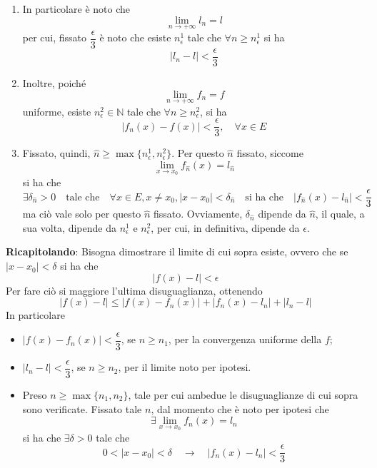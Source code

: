 \documentclass[a4paper]{extarticle}
\begin{document}
\begin{enumerate}
    \item In particolare è noto che
    \[\lim_{n \to +\infty} l_n = l\]
    per cui, fissato $\dfrac{\epsilon}{3}$ è noto che esiste $n^1_\epsilon$ tale che $\forall n \geq n^1_\epsilon$ si ha
    \[\left \vert l_n - l \right \vert < \frac{\epsilon}{3}\]

    \item Inoltre, poiché
    \[\lim_{n \to +\infty} f_n = f\]
    uniforme, esiste $n^2_\epsilon \in \mathbb{N}$ tale che $\forall n \geq n^2_\epsilon$, si ha
    \[\left \vert f_n(x) - f(x) \right \vert < \frac{\epsilon}{3}, \hspace{1em} \forall x \in E\]

    \item Fissato, quindi, $\hat n \geq \max \{n^1_\epsilon,n^2_\epsilon\}$. Per questo $\hat n$ fissato, siccome
    \[\lim_{x \to x_0} f_{\hat n}(x) = l_{\hat n}\]
    si ha che
    \[\exists \delta_{\hat n} > 0 \hspace{1em} \text{tale che} \hspace{1em}\forall x \in E, x \neq x_0, \left \vert x - x_0 \right \vert < \delta_{\hat n} \hspace{1em} \text{si ha che} \hspace{1em} \left \vert f_{\hat n}(x) - l_{\hat n} \right \vert < \frac{\epsilon}{3}\]
    ma ciò vale solo per questo $\hat n$ fissato. Ovviamente, $\delta_{\hat n}$ dipende da $\hat n$, il quale, a sua volta, dipende da $n^1_\epsilon$ e $n^2_\epsilon$, per cui, in definitiva, dipende da $\epsilon$.
\end{enumerate}

\vspace{2em}
\noindent
\textbf{Ricapitolando}: Bisogna dimostrare il limite di cui sopra esiste, ovvero che se $\left \vert x - x_0 \right \vert < \delta$ si ha che
\[\left \vert f(x) - l \right \vert < \epsilon\]
Per fare ciò si maggiore l'ultima disuguaglianza, ottenendo
\[\left \vert f(x) - l \right \vert \leq \left \vert f(x) - f_n(x) \right \vert + \left \vert f_n(x) - l_n \right \vert + \left \vert l_n - l \right \vert\]
In particolare
\begin{itemize}
    \item $\left \vert f(x) - f_n(x) \right \vert < \dfrac{\epsilon}{3}$, se $n \geq n_1$, per la convergenza uniforme della $f$;
    \item $\left \vert l_n - l \right \vert < \dfrac{\epsilon}{3}$, se $n \geq n_2$, per il limite noto per ipotesi.
    \item Preso $n \geq \max\{n_1,n_2\}$, tale per cui ambedue le disuguaglianze di cui sopra sono verificate. Fissato tale $n$, dal momento che è noto per ipotesi che
    \[\exists \lim_{x \to x_0} f_n(x) = l_n\]
    si ha che $\exists \delta > 0$ tale che
    \[0 < \left \vert x - x_0 \right \vert < \delta \hspace{1em} \rightarrow \hspace{1em} \left \vert f_n(x) - l_n \right \vert < \dfrac{\epsilon}{3}\]
\end{itemize}
\end{document}
